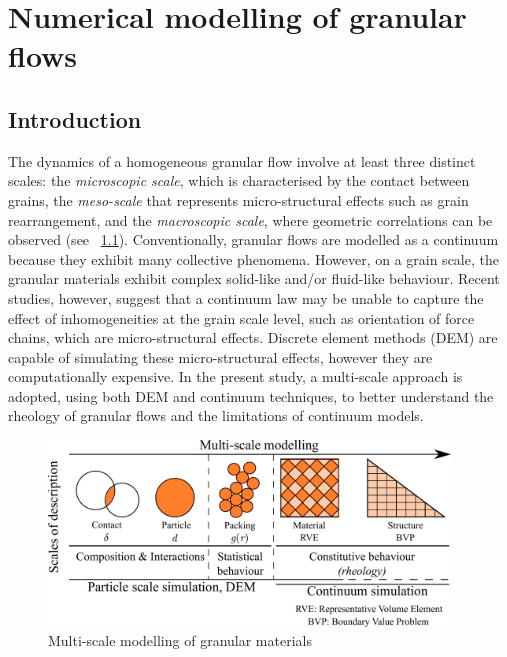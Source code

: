 \chapter{Numerical modelling of granular flows}

\ifpdf
    \graphicspath{{Chapter3/figs/raster/}{Chapter3/figs/pdf/}{Chapter3/figs/}}
\else
    \graphicspath{{Chapter3/figs/vector/}{Chapter3/figs/}}
\fi

\section{Introduction}

The dynamics of a homogeneous granular flow involve at least three distinct 
scales: the \textit{microscopic scale}, which 
is characterised by the contact between grains, the \textit{meso-scale} that 
represents micro-structural effects such as grain rearrangement, and the 
\textit{macroscopic scale}, where geometric correlations can be observed (see 
~\cref{fig:multiscale}). Conventionally, granular flows are modelled as a 
continuum because they exhibit many collective phenomena. However, on a grain 
scale, the granular materials exhibit complex solid-like and/or fluid-like 
behaviour. Recent studies, however, suggest that a continuum law may be unable 
to capture the effect of inhomogeneities at the grain scale level, such as 
orientation of force chains, which are micro-structural effects. Discrete 
element methods (DEM) are capable of simulating these micro-structural effects, 
however they are computationally expensive. In the present study, a multi-scale 
approach is adopted, using both DEM and continuum techniques, to better 
understand the rheology of granular flows and the limitations of continuum 
models.

\begin{figure}[tbhp]
\centering
\includegraphics[width=0.95\textwidth]{multiscale}
\caption{Multi-scale modelling of granular materials}
\label{fig:multiscale}
\end{figure}


